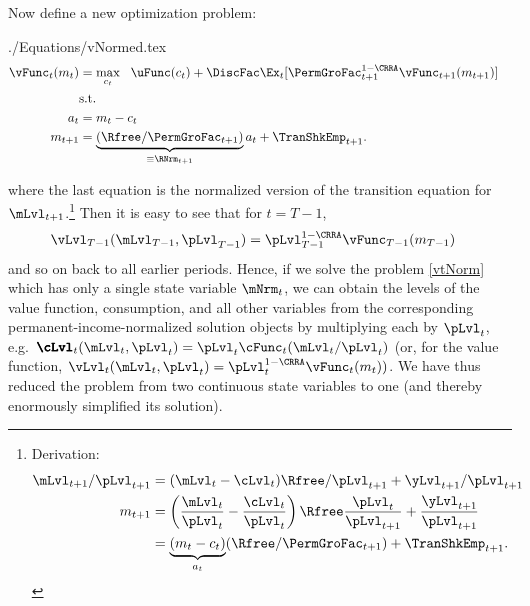 \documentclass[titlepage, headings=optiontotocandhead]{\econtex}
\begin{document}
Now define a new optimization problem:
\begin{verbatimwrite}{./Equations/vNormed.tex}
  \begin{equation}\begin{gathered}\begin{aligned}
        \null{\vFunc}_{t}({m}_{t})  & = \max_{{c}_{t}} ~~ \uFunc({c}_{t})+
        {\DiscFac}\Ex_{t}[ \PermGroFac_{t+1}^{1-\CRRA}\null{\vFunc}_{t+1}({m}_{t+1})] \label{vtNorm}
        \\         & \text{s.t.} &   \\
        {a}_{t}    & = {m}_{t}-{c}_{t} 
        \\      {m}_{t+1}  & = \underbrace{\left(\Rfree/\PermGroFac_{t+1}\right)}_{\equiv \RNrm_{t+1}}{a}_{t}+\TranShkEmp_{t+1} .
      \end{aligned}\end{gathered}\end{equation}
\end{verbatimwrite}
\unskip
where the last equation is the normalized version of the transition equation for $\mLvl_{t+1}$.\footnote{Derivation:
  \begin{equation*}\begin{gathered}\begin{aligned}
        \mLvl_{t+1}/\pLvl_{t+1}  & = (\mLvl_{t}-\cLvl_{t})\Rfree/\pLvl_{t+1} + {\yLvl}_{t+1}/\pLvl_{t+1}
        \\      {m}_{t+1}  & = \left(\frac{\mLvl_{t}}{\pLvl_{t}} - \frac{\cLvl_{t}}{\pLvl_{t}}\right)\Rfree\frac{\pLvl_{t}}{\pLvl_{t+1}} + \frac{{\yLvl}_{t+1}}{\pLvl_{t+1}}
        \\        & = \underbrace{({m}_{t} - {c}_{t})}_{{a}_{t}}(\Rfree/\PermGroFac_{t+1}) + \TranShkEmp_{t+1}.
      \end{aligned}\end{gathered}\end{equation*}
}  Then it is easy to see that for $t=T-1$,
\begin{equation*}\begin{gathered}\begin{aligned}
      {\vLvl}_{T-1}(\mLvl_{T-1},\pLvl_{T-1})  & =  \pLvl_{T-1}^{1-\CRRA}\null{\vFunc}_{T-1}({m}_{T-1})
    \end{aligned}\end{gathered}\end{equation*}
and so on back to all earlier periods.  Hence, if we solve the problem \eqref{vtNorm}
which has only a single state variable $\mNrm_{t}$, we can obtain the levels of
the value function, consumption, and all other variables
from the corresponding permanent-income-normalized solution objects by multiplying each by $\pLvl_{t}$, e.g.\ ${\pmb{\cLvl}}
_{t}(\mLvl_{t},\pLvl_{t})=\pLvl_{t}\cFunc_{t}(\mLvl_{t}/\pLvl_{t})$ (or, for the value function, ${\vLvl}
_{t}({\mLvl}_{t},\pLvl_{t}) = \pLvl_{t}^{1-\CRRA}\vFunc_{t}({m}_{t}))$.  We have thus reduced the
problem from two continuous state variables to one (and thereby enormously simplified its solution).
\end{document}
